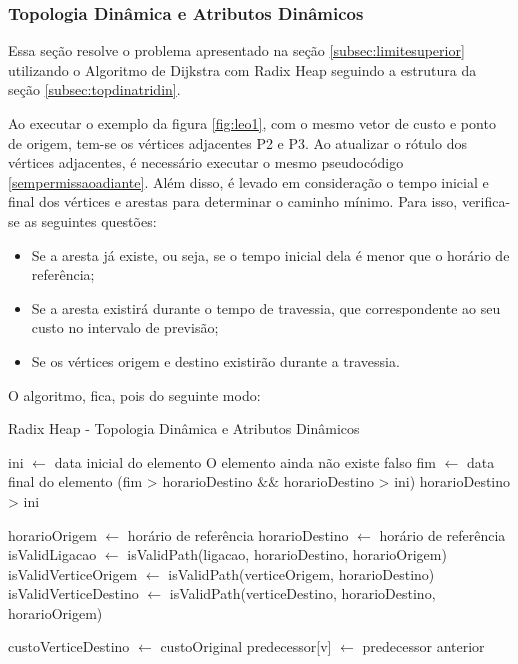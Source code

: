 \subsubsection{Topologia Dinâmica e Atributos Dinâmicos}
Essa seção resolve o problema apresentado na seção \ref{subsec:limitesuperior} utilizando o Algoritmo de
Dijkstra com Radix Heap seguindo a estrutura da seção \ref{subsec:topdinatridin}.

Ao executar o exemplo da figura \ref{fig:leo1}, com o mesmo vetor de custo e ponto de origem, tem-se
os vértices adjacentes P2 e P3. Ao atualizar o rótulo dos vértices adjacentes, é necessário executar o mesmo
pseudocódigo \ref{sempermissaoadiante}. Além disso, é levado em consideração o tempo
inicial e final dos vértices e arestas para determinar o caminho mínimo. Para isso,
verifica-se as seguintes questões:
\begin{itemize}
\item Se a aresta já existe, ou seja, se o tempo inicial dela é menor que o horário de referência;
\item Se a aresta existirá durante o tempo de travessia, que correspondente ao seu custo no intervalo de previsão;
\item Se os vértices origem e destino existirão durante a travessia.
\end{itemize}
\FloatBarrier

O algoritmo, fica, pois do seguinte modo:

\begin{algorithm}
\caption{Radix Heap - Topologia Dinâmica e Atributos Dinâmicos}
\begin{algorithmic}[1]
\State ini $\leftarrow$ data inicial do elemento
  \State O elemento ainda não existe \Return falso
\EndIf
{}
  \State fim $\leftarrow$ data final do elemento
  \State\Return (fim > horarioDestino $\&\&$ horarioDestino > ini)
\EndIf
\Return horarioDestino > ini
\EndFunction

\State horarioOrigem $\leftarrow$ horário de referência
\State horarioDestino $\leftarrow$ horário de referência
\State isValidLigacao $\leftarrow$ isValidPath(ligacao, horarioDestino, horarioOrigem)
\State isValidVerticeOrigem $\leftarrow$ isValidPath(verticeOrigem, horarioDestino)
\State isValidVerticeDestino $\leftarrow$ isValidPath(verticeDestino, horarioDestino, horarioOrigem)

  \State custoVerticeDestino $\leftarrow$ custoOriginal
  \State predecessor[v] $\leftarrow$ predecessor anterior
\EndIf
\end{algorithmic}
\label{algtudodinamico}
\end{algorithm}
\FloatBarrier

